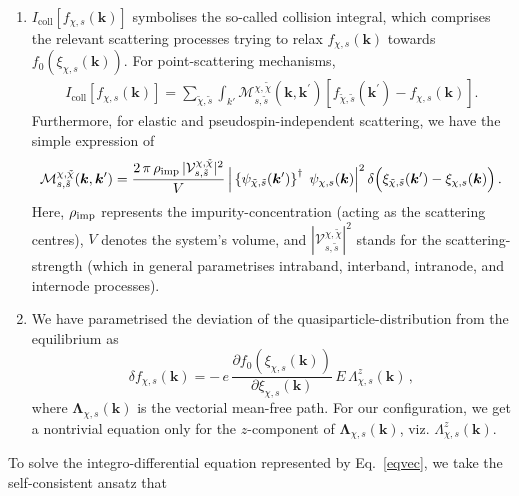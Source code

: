 \documentclass[aps,prb,onecolumn,nofootinbib,citeautoscript,10pt]{revtex4-2}
\begin{document}
\begin{enumerate}
\item $ I_{\text{coll}} [f_{\chi, s} ({\boldsymbol k}) ] $ symbolises the so-called collision integral, which comprises the relevant scattering processes trying to relax $f_{\chi, s} ({\boldsymbol k})$ towards $f_0 (\xi_{\chi, s}({\boldsymbol k}))$. 
For point-scattering mechanisms,
\begin{align}
I_{\text{coll}} [f_{\chi, s}({\boldsymbol k})]
 = \sum \limits_{\tilde \chi, \tilde s}
\int_{k'}
\mathcal{M}^{\chi, \tilde \chi}_{ s, \tilde s} (\boldsymbol k,\boldsymbol k^\prime)
\left[ f_{\tilde \chi , \tilde s} ( \boldsymbol k^\prime )  - f_{\chi, s} (\boldsymbol k) \right ].
\end{align}
Furthermore, for elastic and pseudospin-independent scattering, we have the simple expression of
\begin{align}
\mathcal{M}^{\chi, \tilde \chi}_{ s, \tilde s} (\boldsymbol k,\boldsymbol k^\prime) 
= \frac{2\, \pi \, \rho_{\rm imp} 
\, |{\mathcal V} ^{\chi, \tilde \chi}_{ s, \tilde s} |^2} 
{V} \,
\Big \vert \left \lbrace  \psi_{ \tilde \chi, \tilde s }({ \boldsymbol k^\prime }) \right \rbrace^\dagger 
\; \psi_{ \chi, s }({ \boldsymbol k}) \Big \vert^2 \,
 \delta \Big( \xi_{\tilde \chi , \tilde s } (\boldsymbol k^\prime)
 - \xi_{  \chi , s } (\boldsymbol k ) \Big) \,.
\end{align}
Here, $ \rho_{\rm imp}$ represents the impurity-concentration (acting as the scattering centres), $V$ denotes the system's volume, and
$ |{\mathcal V} ^{\chi, \tilde \chi}_{ s, \tilde s} |^2 $ stands for the scattering-strength (which in general parametrises intraband, interband, intranode, and internode processes).

\item We have parametrised the deviation of the quasiparticle-distribution from the equilibrium as
$$\delta f_{\chi, s} (\boldsymbol {k}) = -\,	 e\, 	\frac{\partial  f_0 (\xi_{\chi, s}({\boldsymbol k})) }
 {\partial \xi_{\chi, s} ({\boldsymbol k})} 
	\,   E \, {\Lambda}^z_{\chi, s} ( \boldsymbol {k} ) \,,$$
where $ \bm{\Lambda}_{\chi, s} (\boldsymbol {k} ) $ is the vectorial mean-free path. For our configuration, we get a nontrivial equation only for the $z$-component of $ \bm{\Lambda}_{\chi, s} ( \boldsymbol {k} ) $, viz. $ {\Lambda}^z_{   \chi,  s} (\boldsymbol {k} )   $.


\end{enumerate}
To solve the integro-differential equation represented by Eq.~\eqref{eqvec}, we take the self-consistent ansatz \cite{timm} that 
\end{document}
